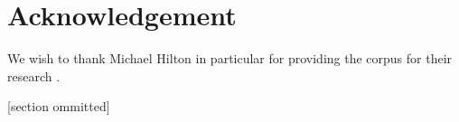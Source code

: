 \documentclass[twoside,12pt,titlepage,a4paper]{article}
\begin{document}
\section{Acknowledgement}
We wish to thank Michael Hilton in particular for providing the corpus for their research \cite{Hilton2016}. 



[section ommitted]



\vskip 0.2in


\end{document}
